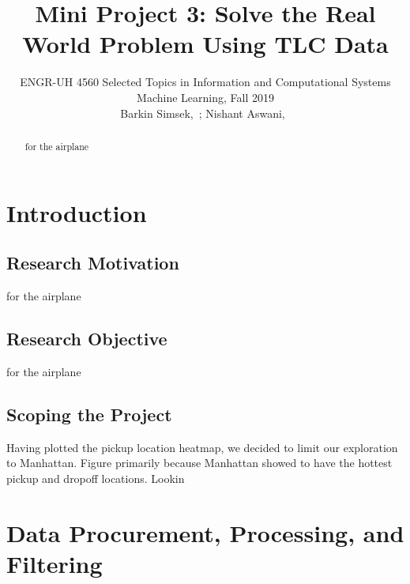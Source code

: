 \documentclass[journal]{IEEEtran}
\begin{document}
{}
\setcounter{page}{1}

\title{Mini Project 3: Solve the Real World Problem Using TLC Data}

\author{ENGR-UH 4560 Selected Topics in  Information and Computational Systems Machine Learning, Fall 2019\\
\medskip
Barkin Simsek,~;
Nishant Aswani,~}%


%
{}

\maketitle

\begin{abstract}
for the airplane
\end{abstract}

\section{Introduction}
\subsection{Research Motivation}
{\color{blue} for the airplane}
\subsection{Research Objective}
{\color{blue} for the airplane}
\subsection{Scoping the Project}
\noindent Having plotted the pickup location heatmap, we decided to limit our exploration to Manhattan. Figure primarily because Manhattan showed to have the hottest pickup and dropoff locations. Lookin

\section{Data Procurement, Processing, and Filtering}
\end{document}
